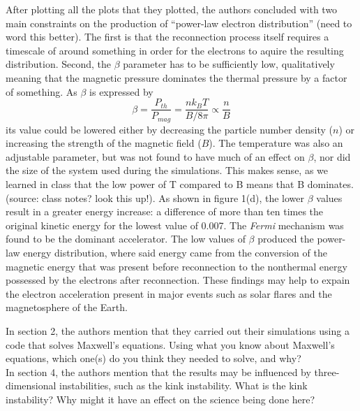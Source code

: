 \documentclass[12pt]{article}
\begin{document}
\noindent After plotting all the plots that they plotted, the authors
concluded with two main constraints on the production of ``power-law
electron distribution'' (need to word this better). The first is that
the reconnection process itself requires a timescale of around
something in order for the electrons to aquire the resulting
distribution. Second, the $\beta$ parameter has to be sufficiently
low, qualitatively meaning that the magnetic pressure dominates the
thermal pressure by a factor of something. As $\beta$ is expressed by
    $$ \beta = \frac{P_{th}}{P_{mag}} = \frac{nk_BT}{B/8\pi}
        \propto \frac{n}{B}$$
its value could be lowered either by decreasing the particle number
density ($n$) or increasing the strength of the magnetic field ($B$).
The temperature was also an adjustable parameter, but was not found to
have much of an effect on $\beta$, nor did the size of the system used
during the simulations. This makes sense, as we learned in
class that the low power of T compared to B means that B dominates.
(source: class notes? look this up!). 
As shown in figure 1(d), the lower $\beta$ values result in a greater
energy increase: a difference of more than ten times the original
kinetic energy for the lowest value of 0.007. 
The \emph{Fermi} mechanism was found to be the dominant accelerator.
The low values of $\beta$ produced the power-law energy
distribution, where said energy came from the conversion of the magnetic
energy that was present before reconnection to the nonthermal energy
possessed by the electrons after reconnection.
These findings may help to expain the electron acceleration present in
major events such as solar flares and the magnetosphere of the Earth.

\newpage
\noindent In section 2, the authors mention that they carried out their
simulations using a code that solves Maxwell's equations. Using what
you know about Maxwell's equations, which one(s) do you think they
needed to solve, and why?\\

\noindent In section 4, the authors mention that the results may be
influenced by three-dimensional instabilities, such as the kink
instability. What is the kink instability? Why might it have an effect
on the science being done here?
\end{document}
